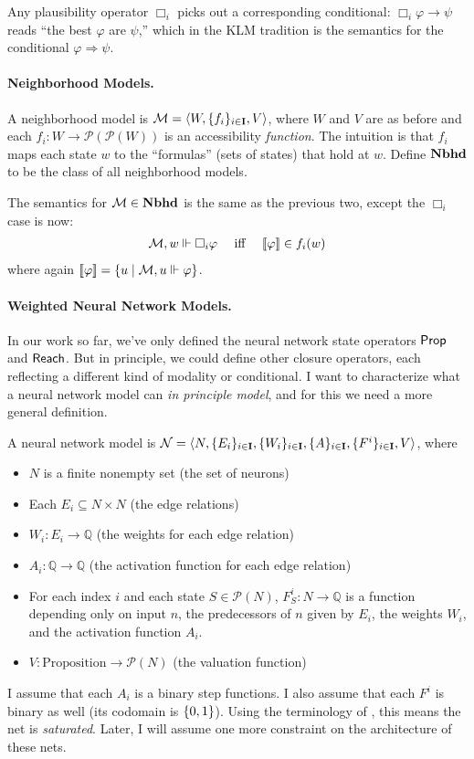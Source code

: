 \documentclass[letterpaper]{article}
\begin{document}
Any plausibility operator $\Box_i$ picks out a corresponding conditional: $\Box_i \varphi \to \psi$ reads ``the best $\varphi$ are $\psi$,'' which in the KLM tradition is the semantics for the conditional $\varphi \Rightarrow \psi$.

\paragraph*{Neighborhood Models.} A neighborhood model is $\mathcal{M} = \langle W, \{ f_i \}_{i \in \textbf{I}}, V \rangle$, where $W$ and $V$ are as before and each $f_i : W \to \mathcal{P}(\mathcal{P}(W))$ is an accessibility \emph{function}.  The intuition is that $f_i$ maps each state $w$ to the ``formulas'' (sets of states) that hold at $w$.  Define $\textrm{\textbf{Nbhd}}$ to be the class of all neighborhood models.

The semantics for $\mathcal{M} \in \textrm{\textbf{Nbhd}}$ is the same as the previous two, except the $\Box_i$ case is now:
\[
\begin{array}{lcl}
    \mathcal{M}, w \Vdash \Box_i \varphi & \mbox{ iff } & [\![\mbox{\em $ \varphi $\/}]\!] \in f_i(w)
\end{array}
\]
where again $[\![\mbox{\em $ \varphi $\/}]\!] = \{ u \mid \mathcal{M}, u \Vdash \varphi \}$.

\paragraph*{Weighted Neural Network Models.} 
In our work \cite{kisby2024hebbian} so far, we've only defined the neural network state operators $\mathsf{Prop}$ and $\mathsf{Reach}$.  But in principle, we could define other closure operators, each reflecting a different kind of modality or conditional.  I want to characterize what a neural network model can \emph{in principle model}, and for this we need a more general definition.

A neural network model is $\mathcal{N} = \langle N, \{ E_i \}_{i \in \textbf{I}}, \{ W_i \}_{i \in \textbf{I}}, \{ A \}_{i \in \textbf{I}}, \{ F^i \}_{i \in \textbf{I}}, V \rangle$, where
\begin{itemize}
    \item $N$ is a finite nonempty set (the set of neurons)
    \item Each $E_i \subseteq N \times N$ (the edge relations)
    \item $W_i : E_i \to \mathbb{Q}$ (the weights for each edge relation)
    \item $A_i : \mathbb{Q} \to \mathbb{Q}$ (the activation function for each edge relation)
    \item For each index $i$ and each state $S \in \mathcal{P}(N)$, $F^i_S : N \to \mathbb{Q}$ is a function depending only on input $n$, the predecessors of $n$ given by $E_i$, the weights $W_i$, and the activation function $A_i$.
    \item $V : \textrm{Proposition} \to \mathcal{P}(N)$ (the valuation function)
\end{itemize}
I assume that each $A_i$ is a binary step functions.  I also assume that each $F^i$ is binary as well (its codomain is $\{ 0, 1 \}$).  Using the terminology of \cite{merrill2020formal}, this means the net is \emph{saturated}.  Later, I will assume one more constraint on the architecture of these nets.
\end{document}
